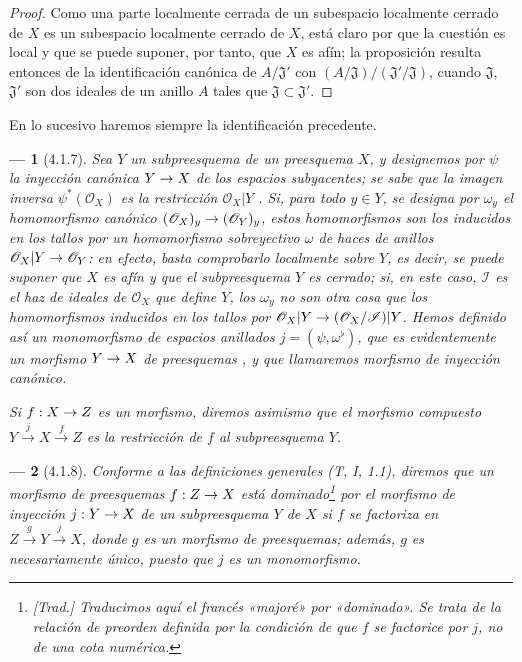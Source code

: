 \documentclass[oneside]{amsart}
\theoremstyle{ega-env-style}
\newtheorem*{env}{---}
\theoremstyle{ega-thm-env-style}
\theoremstyle{ega-defn-env-style}
\renewcommand{\to}{\mathchoice{\longrightarrow}{\rightarrow}{\rightarrow}{\rightarrow}}
\let\EGAOriginalLabel\label
\renewcommand{\label}[1]{\phantomsection\EGAOriginalLabel{#1}}
\begin{document}
\begin{proof}
Como una parte localmente cerrada de un subespacio localmente cerrado de $X$ es un subespacio localmente cerrado de $X$, está claro por  que la cuestión es local y que se puede suponer, por tanto, que $X$ es afín;
la proposición resulta entonces de la identificación canónica de $A/\mathfrak{J}'$ con $(A/\mathfrak{J})/(\mathfrak{J}'/\mathfrak{J})$, cuando $\mathfrak{J}$, $\mathfrak{J}'$ son dos ideales de un anillo $A$ tales que $\mathfrak{J}\subset\mathfrak{J}'$.
\end{proof}

En lo sucesivo haremos siempre la identificación precedente.

\begin{env}[4.1.7]
\label{I.4.1.7}
Sea $Y$ un subpreesquema de un preesquema $X$, y designemos por $\psi$ la inyección canónica $Y\to X$ de los \emph{espacios subyacentes};
se sabe que la imagen inversa $\psi^*(\mathscr{O}_X)$ es la restricción $\mathscr{O}_X|Y$ .
Si, para todo $y\in Y$, se designa por $\omega_y$ el homomorfismo canónico $(\mathscr{O}_X)_y\to(\mathscr{O}_Y)_y$, estos homomorfismos son los inducidos en los tallos por un homomorfismo \emph{sobreyectivo} $\omega$ de haces de anillos $\mathscr{O}_X|Y\to\mathscr{O}_Y$: en efecto, basta comprobarlo localmente sobre $Y$, es decir, se puede suponer que $X$ es afín y que el subpreesquema $Y$ es cerrado; si, en este caso, $\mathscr{I}$ es el haz de ideales de $\mathscr{O}_X$ que define $Y$, los $\omega_y$ no son otra cosa que los homomorfismos inducidos en los tallos por $\mathscr{O}_X|Y\to(\mathscr{O}_X/\mathscr{I})|Y$.
Hemos definido así un \emph{monomorfismo de espacios anillados}  $j=(\psi,\omega^\flat)$, que es evidentemente un morfismo $Y\to X$ de preesquemas , y que llamaremos \emph{morfismo de inyección canónico}.

Si $f:X\to Z$ es un morfismo, diremos asimismo que el morfismo compuesto $Y\xrightarrow{j}X\xrightarrow{f}Z$ es la \emph{restricción} de $f$ al subpreesquema $Y$.
\end{env}

\begin{env}[4.1.8]
\label{I.4.1.8}
Conforme a las definiciones generales (T, I, 1.1), diremos que un morfismo de preesquemas $f:Z\to X$ está \emph{dominado}\footnote{\emph{[Trad.] Traducimos aquí el francés «majoré» por «dominado». Se trata de la relación de preorden definida por la condición de que $f$ se factorice por $j$, no de una cota numérica.}} por el morfismo de inyección $j:Y\to X$ de un subpreesquema $Y$ de $X$ si $f$ se factoriza en $Z\xrightarrow{g}Y\xrightarrow{j}X$, donde $g$ es un morfismo de preesquemas;
además, $g$ es necesariamente \emph{único}, puesto que $j$ es un monomorfismo.
\end{env}
\end{document}
